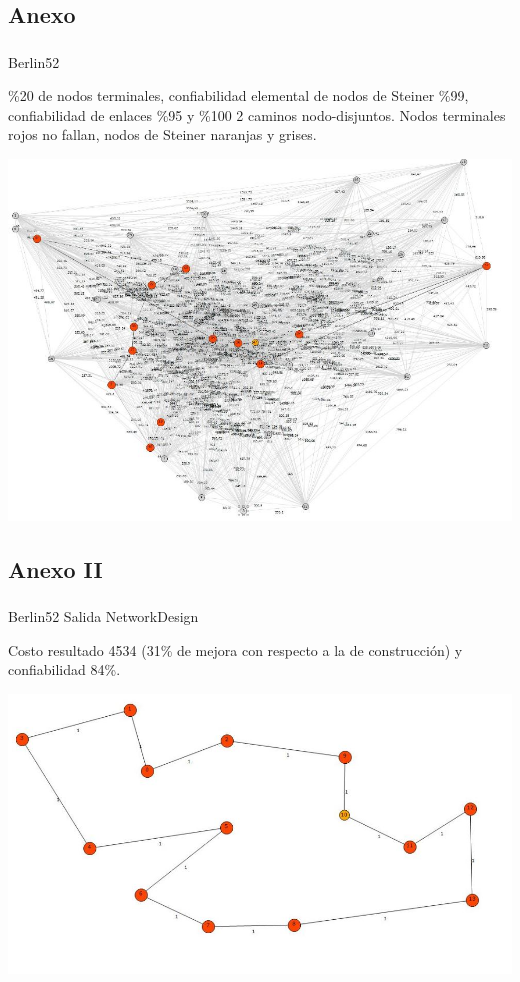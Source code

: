 \subsection{Anexo}
\begin{frame}\frametitle{}
\begin{block}{Berlin52}
\begin{scriptsize}
\%20 de nodos terminales, confiabilidad elemental de nodos de Steiner \%99, confiabilidad de enlaces \%95 y \%100 2 caminos nodo-disjuntos.  Nodos terminales rojos no fallan, nodos de Steiner naranjas y grises.
\end{scriptsize}
\begin{center}
   \includegraphics[scale=0.35]{figuras/3}
\end{center}
\end{block}
\end{frame}

\subsection{Anexo II}
\begin{frame}\frametitle{}
\begin{block}{Berlin52 Salida NetworkDesign}
\begin{scriptsize}
Costo resultado 4534 (31\% de mejora con respecto a la de construcción) y confiabilidad 84\%.
\end{scriptsize}
\begin{center}
   \includegraphics[scale=0.35]{figuras/4}
\end{center}
\end{block}
\end{frame}